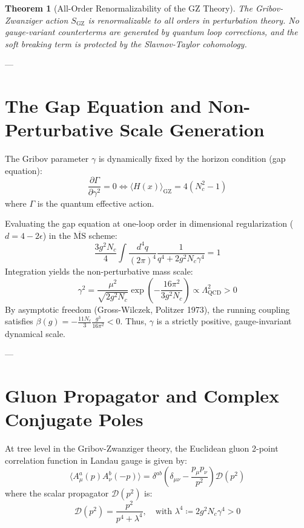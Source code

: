\documentclass[11pt,a4paper]{article}
\newtheorem{theorem}{Theorem}[section]
\theoremstyle{definition}
\begin{document}
\begin{theorem}[All-Order Renormalizability of the GZ Theory]
The Gribov-Zwanziger action $S_{\mathrm{GZ}}$ is renormalizable to all orders in perturbation theory. No gauge-variant counterterms are generated by quantum loop corrections, and the soft breaking term is protected by the Slavnov-Taylor cohomology.
\end{theorem}

---

\section{The Gap Equation and Non-Perturbative Scale Generation}
The Gribov parameter $\gamma$ is dynamically fixed by the horizon condition (gap equation):
\begin{equation}
\frac{\partial \Gamma}{\partial \gamma^2} = 0 \iff \langle H(x) \rangle_{\mathrm{GZ}} = 4 (N_c^2 - 1)
\end{equation}
where $\Gamma$ is the quantum effective action.

Evaluating the gap equation at one-loop order in dimensional regularization ($d = 4 - 2\epsilon$) in the $\overline{\mathrm{MS}}$ scheme:
\begin{equation}
\frac{3 g^2 N_c}{4} \int \frac{d^4q}{(2\pi)^4} \frac{1}{q^4 + 2 g^2 N_c \gamma^4} = 1
\end{equation}
Integration yields the non-perturbative mass scale:
\begin{equation}
\gamma^2 = \frac{\mu^2}{\sqrt{2 g^2 N_c}} \exp\left( -\frac{16 \pi^2}{3 g^2 N_c} \right) \propto \Lambda_{\mathrm{QCD}}^2 > 0
\end{equation}
By asymptotic freedom (Gross-Wilczek, Politzer 1973), the running coupling satisfies $\beta(g) = -\frac{11 N_c}{3} \frac{g^3}{16\pi^2} < 0$. Thus, $\gamma$ is a strictly positive, gauge-invariant dynamical scale.

---

\section{Gluon Propagator and Complex Conjugate Poles}
At tree level in the Gribov-Zwanziger theory, the Euclidean gluon 2-point correlation function in Landau gauge is given by:
\begin{equation}
\langle A_\mu^a(p) A_\nu^b(-p) \rangle = \delta^{ab} \left( \delta_{\mu\nu} - \frac{p_\mu p_\nu}{p^2} \right) \mathcal{D}(p^2)
\end{equation}
where the scalar propagator $\mathcal{D}(p^2)$ is:
\begin{equation}
\mathcal{D}(p^2) = \frac{p^2}{p^4 + \lambda^4}, \quad \text{with } \lambda^4 \coloneqq 2 g^2 N_c \gamma^4 > 0
\end{equation}
\end{document}
